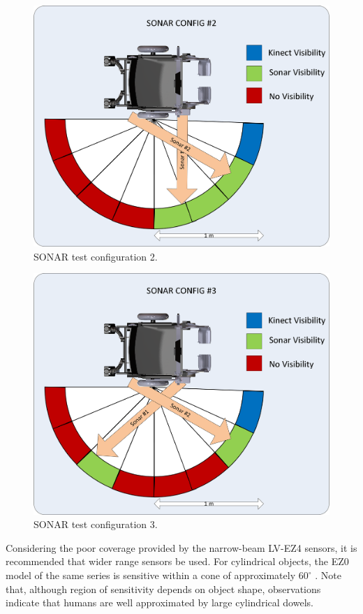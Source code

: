 \documentclass[oneside,final,a4paper]{report}
\begin{document}
\begin{figure}[hbt]
 \centering
 \includegraphics[scale=0.6]{SONAR_Config2.png}
 \caption{SONAR test configuration 2.}
 \label{sonar_2}
\end{figure}

\begin{figure}[hbt]
 \centering
 \includegraphics[scale=0.6]{SONAR_Config3.png}
 \caption{SONAR test configuration 3.}
 \label{sonar_3}
\end{figure}

Considering the poor coverage provided by the narrow-beam LV-EZ4 sensors, it is recommended that wider range sensors be used.  For cylindrical objects, the EZ0 model of the same series is sensitive within a cone of approximately $60^\circ$ \cite{lv-ez0}.  Note that, although region of sensitivity depends on object shape, observations indicate that humans are well approximated by large cylindrical dowels.  
\end{document}
